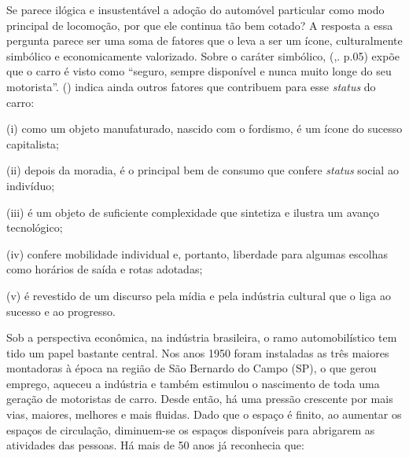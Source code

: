 Se parece ilógica e insustentável a adoção do automóvel particular como modo principal de locomoção, por que ele continua tão bem cotado? A resposta a essa pergunta parece ser uma soma de fatores que o leva a ser um ícone, culturalmente simbólico e economicamente valorizado. 
Sobre o caráter simbólico,  (\citeyear{BANISTER2005},. p.05) expõe que o carro é visto como ``seguro, sempre disponível e nunca muito longe do seu motorista''.  (\citeyear{URRY2001}) indica ainda outros fatores que contribuem para esse \emph{status} do carro: 
\begin{compactitem}[]
\item (i) como um objeto manufaturado, nascido com o fordismo, é um ícone do sucesso capitalista; 
\item (ii) depois da moradia, é o principal bem de consumo que confere \emph{status} social ao indivíduo;
\item (iii) é um objeto de suficiente complexidade que sintetiza e ilustra um avanço tecnológico;
\item (iv) confere mobilidade individual e, portanto, liberdade para algumas escolhas como horários de saída e rotas adotadas;
\item (v) é revestido de um discurso pela mídia e pela indústria cultural que o liga ao sucesso e ao progresso.
\end{compactitem}

Sob a perspectiva econômica, na indústria brasileira, o ramo automobilístico tem tido um papel bastante central. Nos anos 1950 foram instaladas as três maiores montadoras à época na região de São Bernardo do Campo (SP), o que gerou emprego, aqueceu a indústria e também estimulou o nascimento de toda uma geração de motoristas de carro. Desde então, há uma pressão crescente por mais vias, maiores, melhores e mais fluidas.
Dado que o espaço é finito, ao aumentar os espaços de circulação, diminuem-se os espaços disponíveis para abrigarem as atividades das pessoas. Há mais de 50 anos  já reconhecia que:

